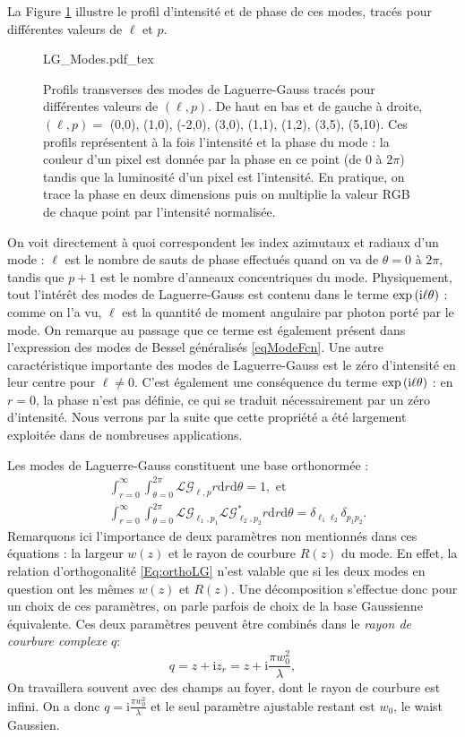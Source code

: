 La Figure \ref{Fig:LGModes} illustre le profil d'intensité et de phase de ces modes, tracés pour différentes valeurs de $\ell$ et $p$.
\begin{figure}[!ht]
\centering
\def\svgwidth{\columnwidth}
{LG_Modes.pdf_tex}
\caption{Profils transverses des modes de Laguerre-Gauss tracés pour différentes valeurs de $(\ell,p)$. De haut en bas et de gauche à droite, $(\ell,p) =$ (0,0), (1,0), (-2,0), (3,0), (1,1), (1,2), (3,5), (5,10). Ces profils représentent à la fois l'intensité et la phase du mode : la couleur d'un pixel est donnée par la phase en ce point (de 0 à $2\pi$) tandis que la luminosité d'un pixel est l'intensité. En pratique, on trace la phase en deux dimensions puis on multiplie la valeur RGB de chaque point par l'intensité normalisée.}
\label{Fig:LGModes}
\end{figure}

On voit directement à quoi correspondent les index azimutaux et radiaux d'un mode : $\ell$ est le nombre de sauts de phase effectués quand on va de $\theta = 0$ à $2\pi$, tandis que $p+1$ est le nombre d'anneaux concentriques du mode. Physiquement, tout l'intérêt des modes de Laguerre-Gauss est contenu dans le terme $\exp{({\mathrm{i}}\ell \theta )}$ : comme on l'a vu, $\ell$ est la quantité de moment angulaire par photon porté par le mode. On remarque au passage que ce terme est également présent dans l'expression des modes de Bessel généralisés \ref{eqModeFcn}. Une autre caractéristique importante des modes de Laguerre-Gauss est le zéro d'intensité en leur centre pour $\ell \neq 0$. C'est également une conséquence du terme $\exp{({\mathrm{i}}\ell \theta )}$ : en $r=0$, la phase n'est pas définie, ce qui se traduit nécessairement par un zéro d'intensité. Nous verrons par la suite que cette propriété a été largement exploitée dans de nombreuses applications. 

Les modes de Laguerre-Gauss constituent une base orthonormée : 
\begin{align}
&\int_{r=0}^{\infty}\int_{\theta=0}^{2\pi}{\mathcal{LG}_{\ell,p} r\mathrm{d}r\mathrm{d}\theta} = 1, \mbox{ et}\nonumber\\ 
&\int_{r=0}^{\infty}\int_{\theta=0}^{2\pi}{\mathcal{LG}_{\ell_1,p_1} \mathcal{LG}^{*}_{\ell_2,p_2} r\mathrm{d}r\mathrm{d}\theta} = \delta_{\ell_1\ell_2}\delta_{p_1p_2}.
\label{Eq:orthoLG}
\end{align}
Remarquons ici l'importance de deux paramètres non mentionnés dans ces équations : la largeur $w(z)$ et le rayon de courbure $R(z)$ du mode. En effet, la relation d'orthogonalité \ref{Eq:orthoLG} n'est valable que si les deux modes en question ont les mêmes $w(z)$ et $R(z)$. Une décomposition s'effectue donc pour un choix de ces paramètres, on parle parfois de choix de la base Gaussienne équivalente. Ces deux paramètres peuvent être combinés dans le \textit{rayon de courbure complexe} $q$:
\begin{equation*}
q = z + \mathrm{i}z_r = z + \mathrm{i}\frac{\pi w_0^2}{\lambda},
\end{equation*}
On travaillera souvent avec des champs au foyer, dont le rayon de courbure est infini. On a donc $q = \mathrm{i}\frac{\pi w_0^2}{\lambda}$ et le seul paramètre ajustable restant est $w_0$, le waist Gaussien.


